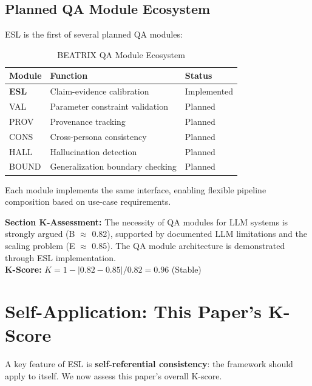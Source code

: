 \documentclass[11pt,a4paper]{article}
\begin{document}
\subsection{Planned QA Module Ecosystem}

ESL is the first of several planned QA modules:

\begin{table}[h]
\centering
\caption{BEATRIX QA Module Ecosystem}
\label{tab:qa-modules}
\begin{tabular}{lll}
\toprule
\textbf{Module} & \textbf{Function} & \textbf{Status} \\
\midrule
\textbf{ESL} & Claim-evidence calibration & Implemented \\
VAL & Parameter constraint validation & Planned \\
PROV & Provenance tracking & Planned \\
CONS & Cross-persona consistency & Planned \\
HALL & Hallucination detection & Planned \\
BOUND & Generalization boundary checking & Planned \\
\bottomrule
\end{tabular}
\end{table}

Each module implements the same interface, enabling flexible pipeline
composition based on use-case requirements.

\begin{eslbox}
\textbf{Section K-Assessment:} The necessity of QA modules for LLM systems
is strongly argued (B $\approx$ 0.82), supported by documented LLM limitations
and the scaling problem (E $\approx$ 0.85). The QA module architecture is
demonstrated through ESL implementation. \\
\textbf{K-Score:} $K = 1 - |0.82 - 0.85| / 0.82 = 0.96$ (Stable)
\end{eslbox}

\section{Self-Application: This Paper's K-Score}

A key feature of ESL is \textbf{self-referential consistency}: the
framework should apply to itself. We now assess this paper's overall
K-score.
\end{document}
